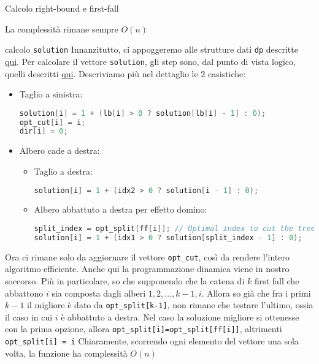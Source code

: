 \begin{algoritmo*}{Calcolo right-bound e first-fall}
	\begin{algorithm}[H]
	\end{algorithm}
\end{algoritmo*}
La complessità rimane sempre $ O\left(n\right) $

\vskip3mm
\hypertarget{taglialegna step 3}{} calcolo \verb|solution|
\vskip3mm
Innanzitutto, ci appoggeremo alle strutture dati \verb|dp| descritte \hyperlink{taglialegna dp data}{qui}. Per calcolare il vettore \verb|solution|, gli step sono, dal punto di vista logico, quelli descritti \hyperlink{taglialegna solution steps}{qui}. Descriviamo più nel dettaglio le 2 casistiche:
\begin{itemize}
	\item Taglio a sinistra:
	      \begin{lstlisting}[language = cpp, frame = none]
solution[i] = 1 + (lb[i] > 0 ? solution[lb[i] - 1] : 0);
opt_cut[i] = i;
dir[i] = 0;\end{lstlisting}%
	\item Albero cade a destra:
	      \begin{itemize}
		      \item Taglio a destra:
		            \begin{lstlisting}[language = cpp, frame = none]
solution[i] = 1 + (idx2 > 0 ? solution[i - 1] : 0);
\end{lstlisting}
		      \item Albero abbattuto a destra per effetto domino:
		            \begin{lstlisting}[language = cpp, frame = none]
split_index = opt_split[ff[i]]; // Optimal index to cut the tree
solution[i] = 1 + (idx1 > 0 ? solution[split_index - 1] : 0);
\end{lstlisting}
	      \end{itemize}
\end{itemize}
Ora ci rimane solo da aggiornare il vettore \verb|opt_cut|, così da rendere l'intero algoritmo efficiente. Anche qui la programmazione dinamica viene in nostro soccorso. Più in particolare, so che supponendo che la catena di $ k $ first fall che abbattono $ i $ sia composta dagli alberi $ 1,2,\ldots ,k-1,i $. Allora so già che fra i primi $ k-1 $ il migliore è dato da \verb|opt_split[k-1]|, non rimane che testare l'ultimo, ossia il caso in cui $ i $ è abbattuto a destra. Nel caso la soluzione migliore si ottenesse con la prima opzione, allora \verb|opt_split[i]=opt_split[ff[i]]|, altrimenti \verb|opt_split[i] = i|
\vskip3mm
Chiaramente, scorrendo ogni elemento del vettore una sola volta, la funzione ha complessità $ O\left(n\right) $

